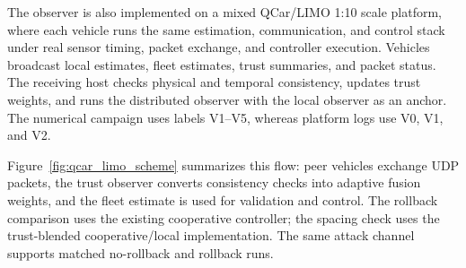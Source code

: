 \documentclass[letterpaper,journal]{IEEEtran}
\begin{document}
The observer is also implemented on a mixed QCar/LIMO 1:10 scale platform, where each vehicle runs the same estimation, communication, and control stack under real sensor timing, packet exchange, and controller execution. Vehicles broadcast local estimates, fleet estimates, trust summaries, and packet status. The receiving host checks physical and temporal consistency, updates trust weights, and runs the distributed observer with the local observer as an anchor. The numerical campaign uses labels V1--V5, whereas platform logs use V0, V1, and V2.

Figure~\ref{fig:qcar_limo_scheme} summarizes this flow: peer vehicles exchange UDP packets, the trust observer converts consistency checks into adaptive fusion weights, and the fleet estimate is used for validation and control. The rollback comparison uses the existing cooperative controller; the spacing check uses the trust-blended cooperative/local implementation. The same attack channel supports matched no-rollback and rollback runs.
\end{document}
